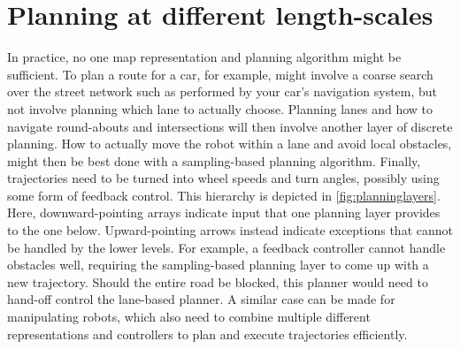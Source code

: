\section{Planning at different length-scales}
In practice, no one map representation and planning algorithm might be sufficient. To plan a route for a car, for example, might involve a coarse search over the street network such as performed by your car's navigation system, but not involve planning which lane to actually choose. Planning lanes and how to navigate round-abouts and intersections will then involve another layer of discrete planning. How to actually move the robot within a lane and avoid local obstacles, might then be best done with a sampling-based planning algorithm. Finally, trajectories need to be turned into wheel speeds and turn angles, possibly using some form of feedback control. This hierarchy is depicted in \cref{fig:planninglayers}. Here, downward-pointing arrays indicate input that one planning layer provides to the one below. Upward-pointing arrows instead indicate exceptions that cannot be handled by the lower levels. For example, a feedback controller cannot handle obstacles well, requiring the sampling-based planning layer to come up with a new trajectory. Should the entire road be blocked, this planner would need to hand-off control the lane-based planner. A similar case can be made for manipulating robots, which also need to combine multiple different representations and controllers to plan and execute trajectories efficiently.

